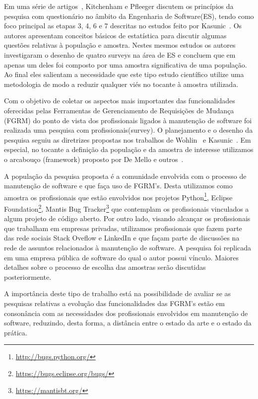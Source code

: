 Em uma série de artigos~\cite{pfleeger2001principles,pfleeger2002principles},
Kitchenham e Pfleeger discutem os princípios da pesquisa com questionário no
âmbito da Engenharia de Software(ES), tendo como foco principal as etapas 3, 4,
6 e 7 descritas no estudos feito por Kasunic~\cite{kasunic2005designing}. Os
autores apresentam conceitos básicos de estatística para discutir algumas
questões relativas à população e amostra. Nestes mesmos estudos os autores
investigaram o desenho de quatro surveys na área de ES e concluem que em
apenas um deles foi composto por uma amostra significativa de uma população. Ao
final eles salientam a necessidade que este tipo estudo científico utilize uma
metodologia de modo a reduzir qualquer viés no tocante à amostra utilizada.

Com o objetivo de coletar os aspectos mais importantes das funcionalidades
oferecidas pelas Ferramentas de Gerenciamento de Requisições de Mudança (FGRM)
do ponto de vista dos profissionais ligados à manutenção de software foi
realizada uma pesquisa com profissionais(survey). O planejamento e o desenho da
pesquisa seguiu as diretrizes propostas nos trabalhos de
Wohlin~\cite{wohlin2012experimentation} e Kasunic~\cite{kasunic2005designing}.
Em especial, no tocante a definição da população e da amostra de interesse
utilizamos o arcabouço (framework) proposto por De Mello e
outros~\cite{de2015investigating, de2014towards}.

A população da pesquisa proposta é a comunidade envolvida com o processo de
manutenção de software e que faça uso de FGRM's. Desta utilizamos  como amostra
os profissionais que estão envolvidos nos projetos
Python\footnote{\url{http://bugs.python.org/}}, Eclipse
Foundation\footnote{\url{https://bugs.eclipse.org/bugs/}}, Mantis Bug
Tracker\footnote{\url{https://mantisbt.org/}} que contemplam os profissionais
vinculados a algum projeto de código aberto. Por outro lado, visando alcançar os
profissionais que trabalham em empresas privadas, utilizamos profissionais que
fazem parte das rede sociais Stack Oveflow e LinkedIn e que façam parte de
discussões na rede de assuntos relacionados à manutenção de software. A pesquisa
foi replicada em uma empresa pública de software do qual o autor possui vínculo.
Maiores detalhes sobre o processo de escolha das amostras serão discutidas
posteriormente.

A importância deste tipo de trabalho está na possibilidade de avaliar se as
pesquisas relativas a evolução das funcionalidades das FGRM's estão em
consonância com as necessidades dos profissionais envolvidos em manutenção de
software, reduzindo, desta forma, a distância entre o estado da arte e o estado
da prática.

